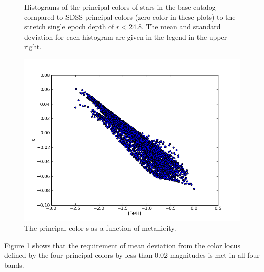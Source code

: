 \documentclass[]{article}
\begin{document}
{\begin{figure}[H]
\caption{Histograms of the principal colors of stars in the base catalog compared to SDSS principal colors (zero color in these plots) to the stretch single epoch 
depth of $r < 24.8$. The mean and standard deviation for each 
histogram are given in the legend in the upper right.\label{fig:principalcolorshist}}
\end{figure}
\begin{figure}[H]
\centering
\includegraphics[width=5in]{validation_figures/s_met.png}
\caption{The principal color s as a function of metallicity.\label{fig:sfeh}}
\end{figure}


Figure \ref{fig:principalcolorshist} shows that the requirement of mean deviation from the color locus defined by the four principal colors by less than 
0.02 magnitudes is met in all four bands.

}
\end{document}
